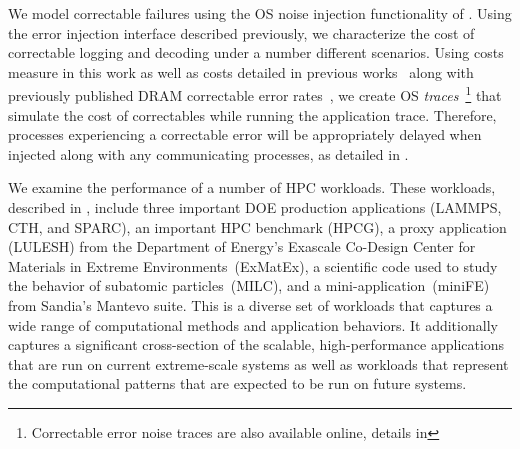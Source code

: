 We model correctable failures using the OS noise injection functionality of
\LogGOPSim.  Using the error injection interface described previously, we
characterize the cost of correctable logging and decoding under a number
different scenarios.  Using costs measure in this work as well as costs
detailed in previous works~\cite{Gottscho:2017:Measuring} along with previously
published DRAM correctable error
rates~\cite{Li10,Hwang12,Sridharan13,Bautista-Gomez:2016:Unprotected}, we create
OS \emph{traces}~\footnote{Correctable error noise traces are also available
online, details in } that simulate the cost of correctables
while running the application trace.  Therefore, processes experiencing a
correctable error will be appropriately delayed when injected along with any
communicating processes, as detailed in .

We examine the performance of a number of HPC workloads.  These workloads,
described in , include three important DOE production
applications (LAMMPS, CTH, and SPARC), an important HPC benchmark (HPCG), a
proxy application (LULESH) from the Department of Energy's Exascale Co-Design
Center for Materials in Extreme Environments~(ExMatEx), a scientific code used
to study the behavior of subatomic particles~(MILC), and a
mini-application~(miniFE) from Sandia's Mantevo suite.  This is a diverse set of
workloads that captures a wide range of computational methods and application
behaviors.  It additionally captures a significant cross-section of the
scalable, high-performance applications that are run on current extreme-scale
systems as well as workloads that represent the computational patterns that are
expected to be run on future systems. 


\newcommand{\appDescWidth}{10.5cm}


